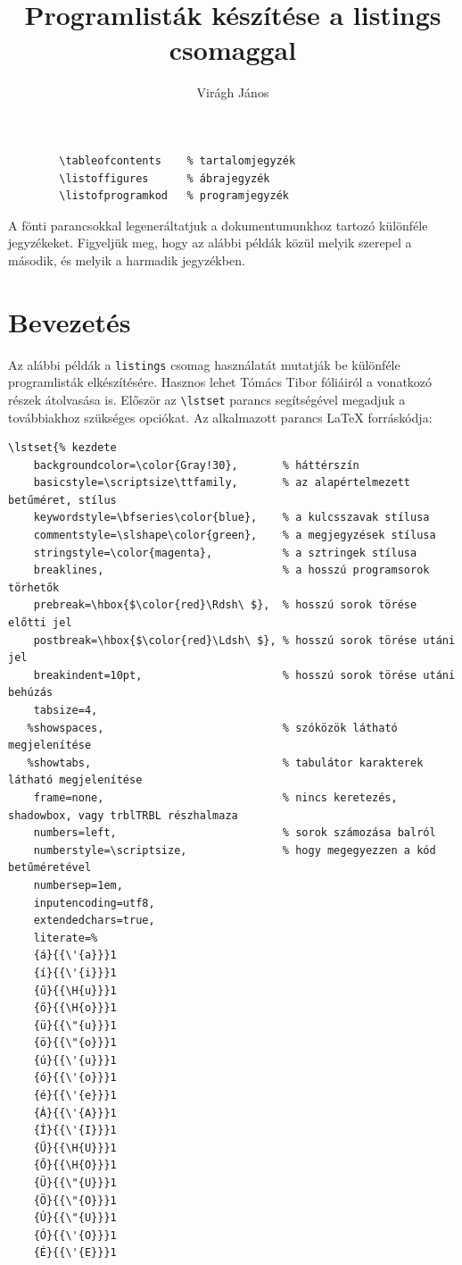 \documentclass{article}
\title{Programlisták készítése a listings csomaggal}
\author{Virágh János}
\begin{document}
	\maketitle
	\begin{verbatim}
		\tableofcontents    % tartalomjegyzék
		\listoffigures      % ábrajegyzék
		\listofprogramkod   % programjegyzék
	\end{verbatim}
	
	A fönti parancsokkal legeneráltatjuk a dokumentumunkhoz tartozó különféle jegyzékeket. Figyeljük meg, hogy az alábbi példák közül melyik szerepel a második, és melyik a harmadik jegyzékben.
	
	\tableofcontents
	\listoffigures
	\listofprogramkod

\section{Bevezetés}
Az alábbi példák a \verb!listings! csomag használatát mutatják be különféle programlisták elkészítésére. Hasznos lehet Tómács Tibor fóliáiról a vonatkozó részek átolvasása is. Először az \verb!\lstset! parancs segítségével megadjuk a továbbiakhoz szükséges opciókat. Az alkalmazott parancs \LaTeX{} forráskódja:
{\small
\begin{verbatim}
\lstset{% kezdete
    backgroundcolor=\color{Gray!30},       % háttérszín
    basicstyle=\scriptsize\ttfamily,       % az alapértelmezett betűméret, stílus
    keywordstyle=\bfseries\color{blue},    % a kulcsszavak stílusa
    commentstyle=\slshape\color{green},    % a megjegyzések stílusa
    stringstyle=\color{magenta},           % a sztringek stílusa
    breaklines,                            % a hosszú programsorok törhetők
    prebreak=\hbox{$\color{red}\Rdsh\ $},  % hosszú sorok törése előtti jel
    postbreak=\hbox{$\color{red}\Ldsh\ $}, % hosszú sorok törése utáni jel
    breakindent=10pt,                      % hosszú sorok törése utáni behúzás
    tabsize=4,
   %showspaces,                            % szóközök látható megjelenítése
   %showtabs,                              % tabulátor karakterek látható megjelenítése
    frame=none,                            % nincs keretezés, shadowbox, vagy trblTRBL részhalmaza
    numbers=left,                          % sorok számozása balról
    numberstyle=\scriptsize,               % hogy megegyezzen a kód betűméretével
    numbersep=1em,
    inputencoding=utf8,
    extendedchars=true,
    literate=%
    {á}{{\'{a}}}1
    {í}{{\'{i}}}1
    {ű}{{\H{u}}}1
    {ő}{{\H{o}}}1
    {ü}{{\"{u}}}1
    {ö}{{\"{o}}}1
    {ú}{{\'{u}}}1
    {ó}{{\'{o}}}1
    {é}{{\'{e}}}1
    {Á}{{\'{A}}}1
    {Í}{{\'{I}}}1
    {Ű}{{\H{U}}}1
    {Ő}{{\H{O}}}1
    {Ü}{{\"{U}}}1
    {Ö}{{\"{O}}}1
    {Ú}{{\"{U}}}1
    {Ó}{{\'{O}}}1
    {É}{{\'{E}}}1
\end{verbatim}
}
\end{document}
